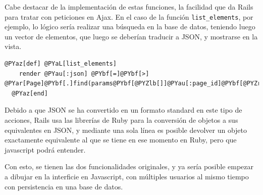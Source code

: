 Cabe destacar de la implementación de estas funciones, la facilidad que da Rails para tratar con peticiones en Ajax. En el caso de la función \texttt{list\_elements}, por ejemplo, lo lógico sería realizar una búsqueda en la base de datos, teniendo luego un vector de elementos, que luego se deberían traducir a JSON, y mostrarse en la vista.

\begin{Verbatim}[commandchars=@\[\]]
  @PYaz[def] @PYaL[list_elements]
    render @PYau[:json] @PYbf[=]@PYbf[>] @PYar[Page]@PYbf[.]find(params@PYbf[@PYZlb[]]@PYau[:page_id]@PYbf[@PYZrb[]])@PYbf[.]elements
  @PYaz[end]
\end{Verbatim}



Debido a que JSON se ha convertido en un formato standard en este tipo de acciones, Rails usa las librerías de Ruby para la conversión de objetos a sus equivalentes en JSON, y mediante una sola línea es posible devolver un objeto exactamente equivalente al que se tiene en ese momento en Ruby, pero que javascript podrá entender.

Con esto, se tienen las dos funcionalidades originales, y ya sería posible empezar a dibujar en la interficie en Javascript, con múltiples usuarios al mismo tiempo con persistencia en una base de datos.


